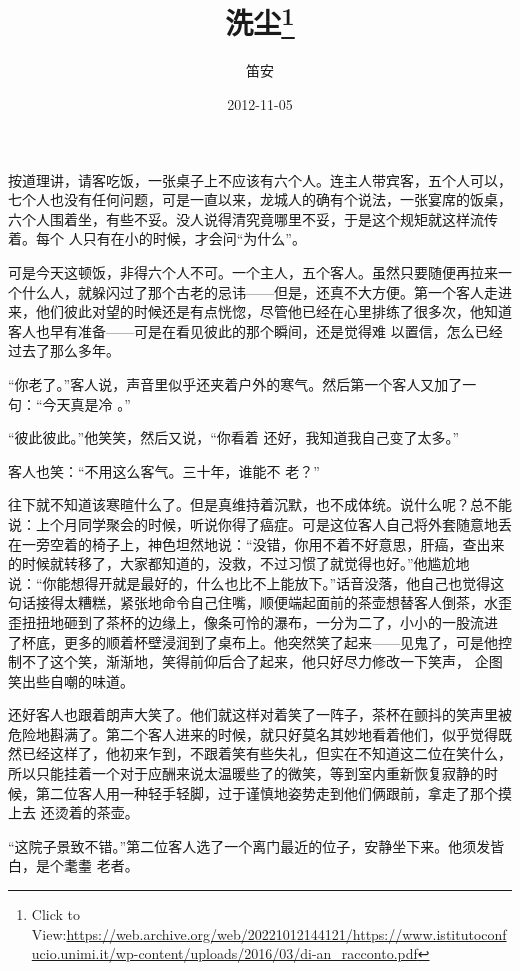 \documentclass{article}
\title{洗尘\footnote{Click to View:\url{https://web.archive.org/web/20221012144121/https://www.istitutoconfucio.unimi.it/wp-content/uploads/2016/03/di-an_racconto.pdf}}}
\author{笛安}
\date{2012-11-05}
\begin{document}

\maketitle


\Large

﻿按道理讲，请客吃饭，一张桌子上不应该有六个人。连主人带宾客，五个人可以，七个人也没有任何问题，可是一直以来，龙城人的确有个说法，一张宴席的饭桌，六个人围着坐，有些不妥。没人说得清究竟哪里不妥，于是这个规矩就这样流传着。每个
人只有在小的时候，才会问“为什么”。 

可是今天这顿饭，非得六个人不可。一个主人，五个客人。虽然只要随便再拉来一个什么人，就躲闪过了那个古老的忌讳——但是，还真不大方便。第一个客人走进来，他们彼此对望的时候还是有点恍惚，尽管他已经在心里排练了很多次，他知道客人也早有准备——可是在看见彼此的那个瞬间，还是觉得难
以置信，怎么已经过去了那么多年。 

\newpage

“你老了。”客人说，声音里似乎还夹着户外的寒气。然后第一个客人又加了一句：“今天真是冷
。” 

“彼此彼此。”他笑笑，然后又说，“你看着
还好，我知道我自己变了太多。” 

客人也笑：“不用这么客气。三十年，谁能不
老？” 

往下就不知道该寒暄什么了。但是真维持着沉默，也不成体统。说什么呢？总不能说：上个月同学聚会的时候，听说你得了癌症。可是这位客人自己将外套随意地丢在一旁空着的椅子上，神色坦然地说：“没错，你用不着不好意思，肝癌，查出来的时候就转移了，大家都知道的，没救，不过习惯了就觉得也好。”他尴尬地说：“你能想得开就是最好的，什么也比不上能放下。”话音没落，他自己也觉得这句话接得太糟糕，紧张地命令自己住嘴，顺便端起面前的茶壶想替客人倒茶，水歪歪扭扭地砸到了茶杯的边缘上，像条可怜的瀑布，一分为二了，小小的一股流进
\newpage
了杯底，更多的顺着杯壁浸润到了桌布上。他突然笑了起来——见鬼了，可是他控制不了这个笑，渐渐地，笑得前仰后合了起来，他只好尽力修改一下笑声，
企图笑出些自嘲的味道。 

还好客人也跟着朗声大笑了。他们就这样对着笑了一阵子，茶杯在颤抖的笑声里被危险地斟满了。第二个客人进来的时候，就只好莫名其妙地看着他们，似乎觉得既然已经这样了，他初来乍到，不跟着笑有些失礼，但实在不知道这二位在笑什么，所以只能挂着一个对于应酬来说太温暖些了的微笑，等到室内重新恢复寂静的时候，第二位客人用一种轻手轻脚，过于谨慎地姿势走到他们俩跟前，拿走了那个摸上去
还烫着的茶壶。 

“这院子景致不错。”第二位客人选了一个离门最近的位子，安静坐下来。他须发皆白，是个耄耋
老者。 
\end{document}
